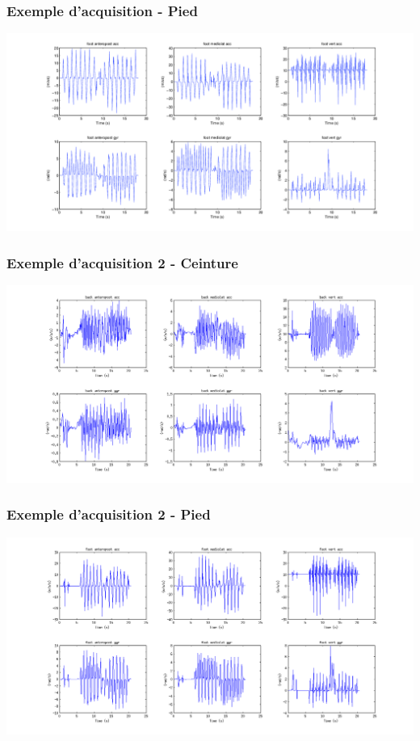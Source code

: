 \documentclass{beamer}
\begin{document}
\begin{frame}
	\frametitle{Exemple d'acquisition - Pied}

			\hspace*{-2.75cm}\includegraphics[scale=0.4]{examplevisufoot}

\end{frame}

\begin{frame}
	\frametitle{Exemple d'acquisition 2 - Ceinture}

	\hspace*{-2.75cm}\includegraphics[scale=0.40]{errorexamplevisuback}

\end{frame}

\begin{frame}
	\frametitle{Exemple d'acquisition 2 - Pied}

			\hspace*{-2.75cm}\includegraphics[scale=0.4]{errorexamplevisufoot}

\end{frame}
\end{document}
